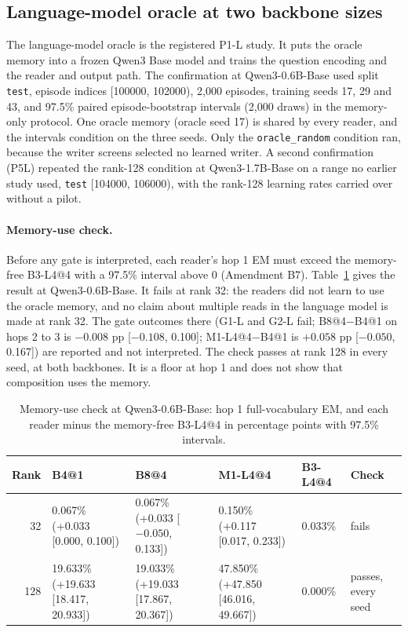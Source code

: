 \subsection{Language-model oracle at two backbone sizes}
\label{sec:lm-oracle}

The language-model oracle is the registered P1-L study.
It puts the oracle memory into a frozen Qwen3 Base model and trains the question encoding and the reader and output path.
The confirmation at Qwen3-0.6B-Base used split \texttt{test}, episode indices [100000, 102000), 2,000 episodes, training seeds 17, 29 and 43, and 97.5\% paired episode-bootstrap intervals (2,000 draws) in the memory-only protocol.  %
One oracle memory (oracle seed 17) is shared by every reader, and the intervals condition on the three seeds.
Only the \texttt{oracle\_random} condition ran, because the writer screens selected no learned writer.
A second confirmation (P5L) repeated the rank-128 condition at Qwen3-1.7B-Base on a range no earlier study used, \texttt{test} [104000, 106000), with the rank-128 learning rates carried over without a pilot.  %

\paragraph{Memory-use check.}
Before any gate is interpreted, each reader's hop 1 EM must exceed the memory-free B3-L4@4 with a 97.5\% interval above 0 (Amendment B7).  %
Table~\ref{tab:memuse} gives the result at Qwen3-0.6B-Base.
It fails at rank 32: the readers did not learn to use the oracle memory, and no claim about multiple reads in the language model is made at rank 32.
The gate outcomes there (G1-L and G2-L fail; B8@4$-$B4@1 on hops 2 to 3 is $-0.008$ pp [$-0.108$, 0.100]; M1-L4@4$-$B4@1 is $+0.058$ pp [$-0.050$, 0.167]) are reported and not interpreted.  %
The check passes at rank 128 in every seed, at both backbones.  %
It is a floor at hop 1 and does not show that composition uses the memory.

\begin{table}[htbp]
\centering\small
\caption{Memory-use check at Qwen3-0.6B-Base: hop 1 full-vocabulary EM, and each reader minus the memory-free B3-L4@4 in percentage points with 97.5\% intervals.  %
}
\label{tab:memuse}
\begin{tabular}{@{}rp{3.0cm}p{3.0cm}p{3.4cm}p{1.5cm}p{1.9cm}@{}}
\toprule
Rank & B4@1 & B8@4 & M1-L4@4 & B3-L4@4 & Check \\
\midrule
32 & 0.067\% (+0.033 [0.000, 0.100]) & 0.067\% (+0.033 [$-0.050$, 0.133]) & 0.150\% (+0.117 [0.017, 0.233]) & 0.033\% & fails \\
128 & 19.633\% (+19.633 [18.417, 20.933]) & 19.033\% (+19.033 [17.867, 20.367]) & 47.850\% (+47.850 [46.016, 49.667]) & 0.000\% & passes, every seed \\
\bottomrule
\end{tabular}
\end{table}

